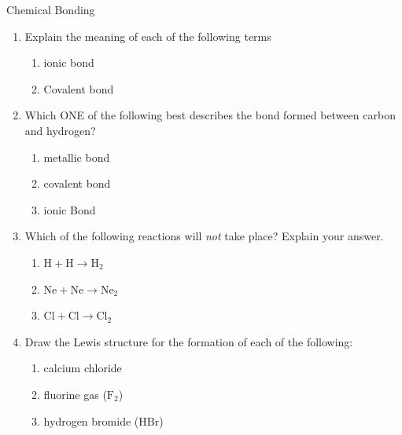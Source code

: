 \label{m38689*secfhsst!!!underscore!!!id1181}
            \begin{eocexercises}{Chemical Bonding}
            \nopagebreak \noindent
      \label{m38689*id147820}\begin{enumerate}[noitemsep, label=\textbf{\arabic*}. ] 
            \label{m38689*uid158}\item Explain the meaning of each of the following terms
\label{m38689*id147842}\begin{enumerate}[noitemsep, label=\textbf{\alph*}. ] 
            \label{m38689*uid159}\item ionic bond
\label{m38689*uid160}\item Covalent bond
\end{enumerate}
                \label{m38689*uid162}\item Which ONE of the following best describes the bond formed between carbon and hydrogen?
\label{m38689*id147923}\begin{enumerate}[noitemsep, label=\textbf{\alph*}. ] 
            \label{m38689*uid163}\item metallic bond
\label{m38689*uid164}\item covalent bond
\label{m38689*uid165}\item ionic Bond
\end{enumerate}
               \label{m38689*uid171}\item Which of the following reactions will \textsl{not} take place? Explain your answer.
\label{m38689*id148047}\begin{enumerate}[noitemsep, label=\textbf{\alph*}. ] 
            \label{m38689*uid172}\item $\mathrm{H}+\mathrm{H}\to {\mathrm{H}}_{2}$\label{m38689*uid173}\item $\mathrm{Ne}+\mathrm{Ne}\to {\mathrm{Ne}}_{2}$\label{m38689*uid174}\item $\mathrm{Cl}+\mathrm{Cl}\to {\mathrm{Cl}}_{2}$\end{enumerate}
                \label{m38689*uid175}\item Draw the Lewis structure for the formation of each of the following:
\label{m38689*id148172}\begin{enumerate}[noitemsep, label=\textbf{\alph*}. ] 
            \label{m38689*uid176}\item calcium chloride
\label{m38689*uid177}\item fluorine gas ($\text{F}_2$)
\label{m38689*uid178}\item hydrogen bromide ($\text{HBr}$)

\end{enumerate}
\end{enumerate}
\end{eocexercises}
